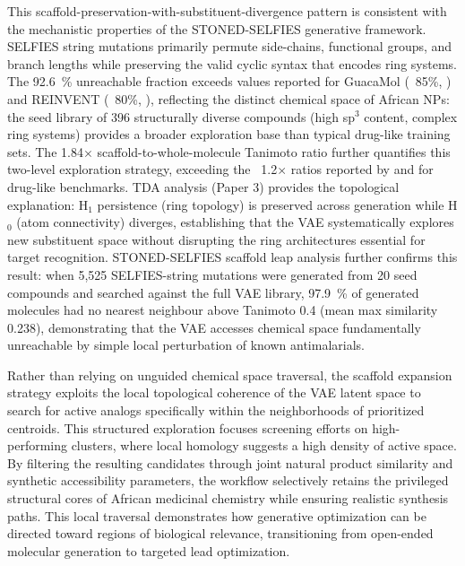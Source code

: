 \documentclass[journal=jcisd8,manuscript=article]{achemso}
\begin{document}
This scaffold-preservation-with-substituent-divergence pattern is consistent with the mechanistic properties of the STONED-SELFIES generative framework. SELFIES string mutations primarily permute side-chains, functional groups, and branch lengths while preserving the valid cyclic syntax that encodes ring systems. The \qty{92.6}{\percent} unreachable fraction exceeds values reported for GuacaMol (~85\%, \cite{Brown2019}) and REINVENT (~80\%, \cite{gomez2018automatic}), reflecting the distinct chemical space of African NPs: the seed library of \num{396} structurally diverse compounds (high sp$^3$ content, complex ring systems) provides a broader exploration base than typical drug-like training sets. The \num{1.84}$\times$ scaffold-to-whole-molecule Tanimoto ratio further quantifies this two-level exploration strategy, exceeding the ~\num{1.2}$\times$ ratios reported by \cite{Brown2019} and \cite{Blaschke2020REINVENT2A} for drug-like benchmarks. TDA analysis (Paper 3) provides the topological explanation: H$_1$ persistence (ring topology) is preserved across generation while H$_0$ (atom connectivity) diverges, establishing that the VAE systematically explores new substituent space without disrupting the ring architectures essential for target recognition. STONED-SELFIES scaffold leap analysis further confirms this result: when 5,525 SELFIES-string mutations were generated from 20 seed compounds and searched against the full VAE library, \qty{97.9}{\percent} of generated molecules had no nearest neighbour above Tanimoto \num{0.4} (mean max similarity \num{0.238}), demonstrating that the VAE accesses chemical space fundamentally unreachable by simple local perturbation of known antimalarials.

Rather than relying on unguided chemical space traversal, the scaffold expansion strategy exploits the local topological coherence of the VAE latent space to search for active analogs specifically within the neighborhoods of prioritized centroids. This structured exploration focuses screening efforts on high-performing clusters, where local homology suggests a high density of active space. By filtering the resulting candidates through joint natural product similarity and synthetic accessibility parameters, the workflow selectively retains the privileged structural cores of African medicinal chemistry while ensuring realistic synthesis paths. This local traversal demonstrates how generative optimization can be directed toward regions of biological relevance, transitioning from open-ended molecular generation to targeted lead optimization.
\end{document}
